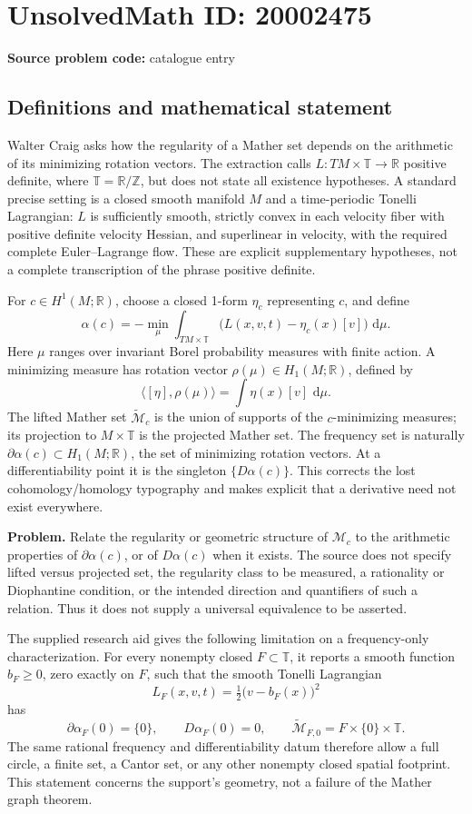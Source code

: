 \documentclass[11pt]{article}
\newcommand{\Z}{\mathbb{Z}}
\newcommand{\R}{\mathbb{R}}
\newcommand{\dd}{\,\mathrm{d}}
\begin{document}
\section*{UnsolvedMath ID: 20002475}
\textbf{Source problem code:} catalogue entry
\subsection{Definitions and mathematical statement}
Walter Craig asks how the regularity of a Mather set depends on the arithmetic of its minimizing rotation vectors. The extraction calls \(L:TM\times\mathbb T\to\R\) positive definite, where \(\mathbb T=\R/\Z\), but does not state all existence hypotheses. A standard precise setting is a closed smooth manifold \(M\) and a time-periodic Tonelli Lagrangian: \(L\) is sufficiently smooth, strictly convex in each velocity fiber with positive definite velocity Hessian, and superlinear in velocity, with the required complete Euler--Lagrange flow. These are explicit supplementary hypotheses, not a complete transcription of the phrase positive definite.

For \(c\in H^1(M;\R)\), choose a closed 1-form \(\eta_c\) representing \(c\), and define
\[
 \alpha(c)=-\min_{\mu}\int_{TM\times\mathbb T}
       \bigl(L(x,v,t)-\eta_c(x)[v]\bigr)\,\dd\mu.
\]
Here \(\mu\) ranges over invariant Borel probability measures with finite action. A minimizing measure has rotation vector \(\rho(\mu)\in H_1(M;\R)\), defined by
\[
 \langle[\eta],\rho(\mu)\rangle=\int\eta(x)[v]\,\dd\mu.
\]
The lifted Mather set \(\widetilde{\mathcal M}_c\) is the union of supports of the \(c\)-minimizing measures; its projection to \(M\times\mathbb T\) is the projected Mather set. The frequency set is naturally \(\partial\alpha(c)\subset H_1(M;\R)\), the set of minimizing rotation vectors. At a differentiability point it is the singleton \(\{D\alpha(c)\}\). This corrects the lost cohomology/homology typography and makes explicit that a derivative need not exist everywhere.

\textbf{Problem.} Relate the regularity or geometric structure of \(\mathcal M_c\) to the arithmetic properties of \(\partial\alpha(c)\), or of \(D\alpha(c)\) when it exists. The source does not specify lifted versus projected set, the regularity class to be measured, a rationality or Diophantine condition, or the intended direction and quantifiers of such a relation. Thus it does not supply a universal equivalence to be asserted.

The supplied research aid gives the following limitation on a frequency-only characterization. For every nonempty closed \(F\subset\mathbb T\), it reports a smooth function \(b_F\ge0\), zero exactly on \(F\), such that the smooth Tonelli Lagrangian
\[
 L_F(x,v,t)=\tfrac12\bigl(v-b_F(x)\bigr)^2
\]
has
\[
 \partial\alpha_F(0)=\{0\},\qquad D\alpha_F(0)=0,\qquad
 \widetilde{\mathcal M}_{F,0}=F\times\{0\}\times\mathbb T.
\]
The same rational frequency and differentiability datum therefore allow a full circle, a finite set, a Cantor set, or any other nonempty closed spatial footprint. This statement concerns the support's geometry, not a failure of the Mather graph theorem.
\end{document}
